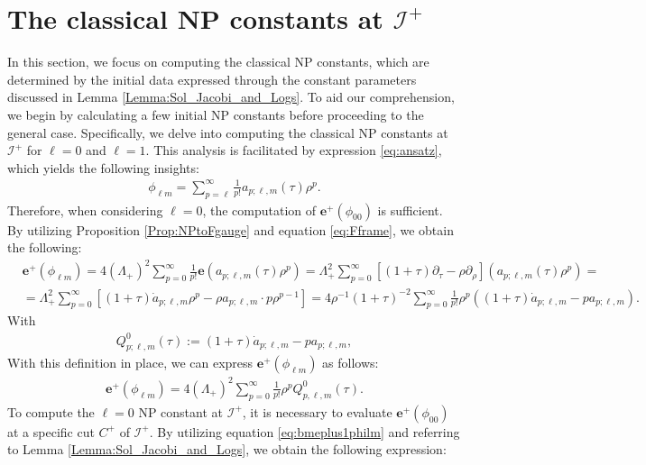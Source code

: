 \section{The classical NP constants at $\mathscr{I}^{+}$}
\label{sec:classicalNP}

In this section, we focus on computing the classical NP constants, which are determined by the initial data expressed through the constant parameters discussed in Lemma \ref{Lemma:Sol_Jacobi_and_Logs}. To aid our comprehension, we begin by calculating a few initial NP constants before proceeding to the general case. Specifically, we delve into computing the classical NP constants at $\mathscr{I}^{+}$ for $\ell=0$ and $\ell=1$. This analysis is facilitated by expression \eqref{eq:ansatz}, which yields the following insights:
\begin{align}\label{eq:exp_phi_lm}
  \phi_{\ell m}= \sum_{p=\ell}^{\infty}\frac{1}{p!}a_{p;\ell,m}(\tau)\rho^{p}.
\end{align}
Therefore, when considering $\ell=0$, the computation of $\boldsymbol{e}^{+}(\phi_{00})$ is sufficient. By utilizing Proposition \ref{Prop:NPtoFgauge} and equation \eqref{eq:Fframe}, we obtain the following:
\begin{align}\label{eq:bmeplus1philmraw}
   & \boldsymbol{e}^{+}(\phi_{\ell m})= 4(\Lambda_{+})^{2}\sum_{p=0}^{\infty}\frac{1}{p!}\boldsymbol{e}(a_{p;\ell,m}(\tau)\rho^{p}) = \Lambda_{+}^{2} \sum_{p=0}^{\infty} \left[(1+\tau) \partial_{\tau}-\rho \partial_{\rho}\right]\left(a_{p ; \ell, m}(\tau) \rho^{p}\right)= \nonumber \\
   & =\Lambda_{+}^{2} \sum_{p=0}^{\infty} \left[(1+\tau) \dot{a}_{p; \ell, m} \rho^{p}-\rho a_{p ; \ell, m} \cdot p \rho^{p-1}\right] = 4 \rho^{-1}(1+\tau)^{-2}\sum_{p=0}^{\infty} \frac{1}{p!}\rho^p((1+\tau)\dot{a}_{p;\ell,m}-p a_{p;\ell,m}).
\end{align}
With
\begin{align}\label{eq:defQ0}
  Q^{0}_{p;\ell,m}(\tau):=(1+\tau)\dot{a}_{p;\ell,m}-p a_{p;\ell,m},
\end{align}
With this definition in place, we can express $\boldsymbol{e}^{+}(\phi_{\ell m})$ as follows:
\begin{align}\label{eq:bmeplus1philm}
  \boldsymbol{e}^{+}(\phi_{\ell m}) = 4 (\Lambda_{+})^{2}\sum_{p=0}^{\infty} \frac{1}{p!}\rho^{p}Q^{0}_{p,\ell,m}(\tau).
\end{align}
To compute the $\ell=0$ NP constant at $\mathscr{I}^{+}$, it is necessary to evaluate $\boldsymbol{e}^{+}(\phi_{00})$ at a specific cut ${C}^{+}$ of $\mathscr{I}^{+}$. By utilizing equation \eqref{eq:bmeplus1philm} and referring to Lemma \ref{Lemma:Sol_Jacobi_and_Logs}, we obtain the following expression:
